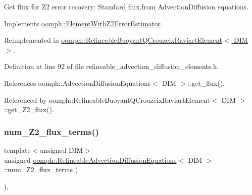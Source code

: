 Get \textquotesingle{}flux\textquotesingle{} for Z2 error recovery\+: Standard flux.\+from Advection\+Diffusion equations. 



Implements \hyperlink{classoomph_1_1ElementWithZ2ErrorEstimator_a5688ff5f546d81771cabad82ca5a7556}{oomph\+::\+Element\+With\+Z2\+Error\+Estimator}.



Reimplemented in \hyperlink{classoomph_1_1RefineableBuoyantQCrouzeixRaviartElement_a1b78fb6b311b89cff1b57fcaacd924d7}{oomph\+::\+Refineable\+Buoyant\+Q\+Crouzeix\+Raviart\+Element$<$ D\+I\+M $>$}.



Definition at line 92 of file refineable\+\_\+advection\+\_\+diffusion\+\_\+elements.\+h.



References oomph\+::\+Advection\+Diffusion\+Equations$<$ D\+I\+M $>$\+::get\+\_\+flux().



Referenced by oomph\+::\+Refineable\+Buoyant\+Q\+Crouzeix\+Raviart\+Element$<$ D\+I\+M $>$\+::get\+\_\+\+Z2\+\_\+flux().

\mbox{\label{classoomph_1_1RefineableAdvectionDiffusionEquations_a19d216ae9ab2602a9da97babe7b66c21}} 
\subsubsection{\texorpdfstring{num\+\_\+\+Z2\+\_\+flux\+\_\+terms()}{num\_Z2\_flux\_terms()}}
{\footnotesize\ttfamily template$<$unsigned D\+IM$>$ \\
unsigned \hyperlink{classoomph_1_1RefineableAdvectionDiffusionEquations}{oomph\+::\+Refineable\+Advection\+Diffusion\+Equations}$<$ D\+IM $>$\+::num\+\_\+\+Z2\+\_\+flux\+\_\+terms (\begin{DoxyParamCaption}{ }\end{DoxyParamCaption})\hspace{0.3cm}{\ttfamily [inline]}, {\ttfamily [virtual]}}



